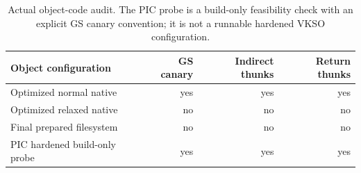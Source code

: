 \begin{table}[h]\centering\small
\caption{Actual object-code audit. The PIC probe is a build-only feasibility check with an explicit GS canary convention; it is not a runnable hardened VKSO configuration.}
\begin{tabular}{lrrr}\toprule Object configuration & GS canary & Indirect thunks & Return thunks \\\midrule
Optimized normal native & yes & yes & yes \\
Optimized relaxed native & no & no & no \\
Final prepared filesystem & no & no & no \\
PIC hardened build-only probe & yes & yes & yes \\
\bottomrule\end{tabular}\end{table}
